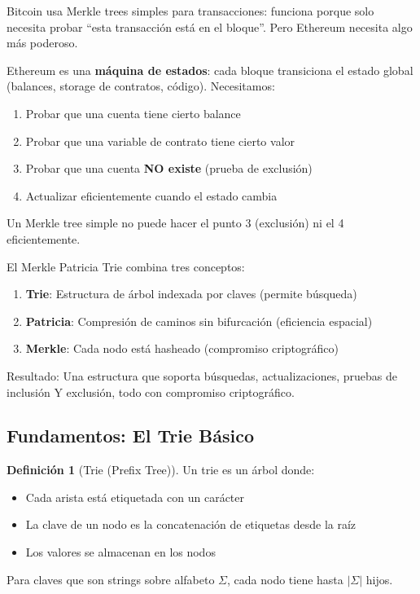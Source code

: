 \documentclass[11pt,a4paper,twoside,openright]{book}
\theoremstyle{definition}
\newtheorem{definition}{Definición}[chapter]
\theoremstyle{plain}
\theoremstyle{remark}
\begin{document}
\begin{intuicion}
Bitcoin usa Merkle trees simples para transacciones: funciona porque solo necesita probar ``esta transacción está en el bloque''. Pero Ethereum necesita algo más poderoso.

Ethereum es una \textbf{máquina de estados}: cada bloque transiciona el estado global (balances, storage de contratos, código). Necesitamos:
\begin{enumerate}
    \item Probar que una cuenta tiene cierto balance
    \item Probar que una variable de contrato tiene cierto valor
    \item Probar que una cuenta \textbf{NO existe} (prueba de exclusión)
    \item Actualizar eficientemente cuando el estado cambia
\end{enumerate}

Un Merkle tree simple no puede hacer el punto 3 (exclusión) ni el 4 eficientemente.
\end{intuicion}

\begin{keyidea}
El Merkle Patricia Trie combina tres conceptos:
\begin{enumerate}
    \item \textbf{Trie}: Estructura de árbol indexada por claves (permite búsqueda)
    \item \textbf{Patricia}: Compresión de caminos sin bifurcación (eficiencia espacial)
    \item \textbf{Merkle}: Cada nodo está hasheado (compromiso criptográfico)
\end{enumerate}

Resultado: Una estructura que soporta búsquedas, actualizaciones, pruebas de inclusión Y exclusión, todo con compromiso criptográfico.
\end{keyidea}

\subsection{Fundamentos: El Trie Básico}

\begin{definition}[Trie (Prefix Tree)]
Un trie es un árbol donde:
\begin{itemize}
    \item Cada arista está etiquetada con un carácter
    \item La clave de un nodo es la concatenación de etiquetas desde la raíz
    \item Los valores se almacenan en los nodos
\end{itemize}

Para claves que son strings sobre alfabeto $\Sigma$, cada nodo tiene hasta $|\Sigma|$ hijos.
\end{definition}
\end{document}
